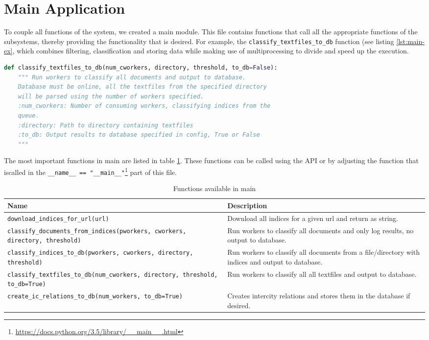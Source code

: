 \section{Main Application} \label{sec:main-app}
To couple all functions of the system, we created a main module. This file contains functions that call all the appropriate functions of the subsystems, thereby providing the functionality that is desired. For example, the \texttt{classify\_textfiles\_to\_db} function (see listing \ref{lst:main-ex}, which combines filtering, classification and storing data while making use of multiprocessing to divide and speed up the execution.

\begin{lstlisting}[language=Python, caption=Header of a function in main.py, label={lst:main-ex}]
def classify_textfiles_to_db(num_cworkers, directory, threshold, to_db=False):
    """ Run workers to classify all documents and output to database.
    Database must be online, all the textfiles from the specified directory
    will be parsed using the number of workers specified.
    :num_cworkers: Number of consuming workers, classifying indices from the
    queue.
    :directory: Path to directory containing textfiles
    :to_db: Output results to database specified in config, True or False
    """
\end{lstlisting}

The most important functions in main are listed in table \ref{tbl:main-functions}. These functions can be called using the API or by adjusting the function that iscalled in the \texttt{\_\_name\_\_ == "\_\_main\_\_"}\footnote{\url{https://docs.python.org/3.5/library/__main__.html}} part of this file.

\begin{table}[H]
\centering
\begin{tabular}{m{8cm} m{8cm}}
\textbf{Name}                     & \textbf{Description} \\\hline
\texttt{download\_indices\_for\_url(url)} & Download all indices for a given url and return as string. \\\hline

\texttt{classify\_documents\_from\_indices(pworkers, cworkers, directory, threshold)} & Run workers to classify all documents and only log results, no output to database.\\\hline

\texttt{classify\_indices\_to\_db(pworkers, cworkers, directory, threshold)} & Run workers to classify all documents from a file/directory with indices and output to database.\\\hline

\texttt{classify\_textfiles\_to\_db(num\_cworkers, directory, threshold, to\_db=True)} & Run workers to classify all all textfiles and output to database.\\\hline

\texttt{create\_ic\_relations\_to\_db(num\_workers, to\_db=True)} & Creates intercity relations and stores them in the database if desired. \\\hline 

\end{tabular}
\caption{Functions available in main}
\label{tbl:main-functions}
\end{table}